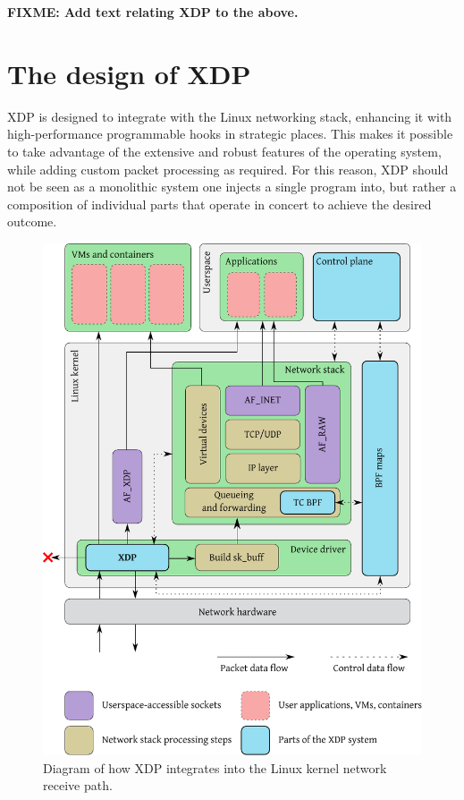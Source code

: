 \documentclass[10pt,sigconf]{acmart}
\begin{document}
\textbf{FIXME: Add text relating XDP to the above.}


\section{The design of XDP}
\label{sec:design}
XDP is designed to integrate with the Linux networking stack, enhancing it with
high-performance programmable hooks in strategic places. This makes it possible
to take advantage of the extensive and robust features of the operating system,
while adding custom packet processing as required. For this reason, XDP should
not be seen as a monolithic system one injects a single program into, but rather
a composition of individual parts that operate in concert to achieve the desired
outcome.

\begin{figure}[t]
\centering
\includegraphics[width=\linewidth]{figures/kernel-diagram.pdf}
\caption{\label{fig:xdp-kernel} Diagram of how XDP integrates into the Linux
  kernel network receive path.}
\end{figure}
\end{document}
